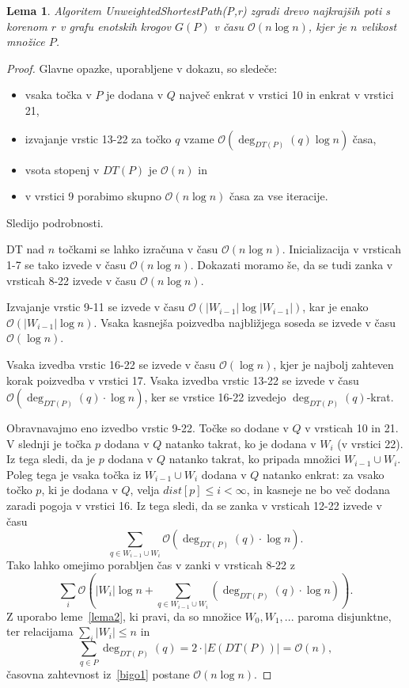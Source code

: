 \documentclass[a4paper, 12pt]{book}
\newcommand{\OO}{\ensuremath{\mathcal{O}}} %
\newtheorem{lema}[izrek]{Lema}
\begin{document}
\begin{lema}
\label{lema3}
Algoritem \textit{Unweigh\-ted\-Shor\-test\-Path(P,r)} zgradi drevo najkrajših poti s korenom $r$ v grafu enotskih krogov $G(P)$ v času $\OO(n\log n)$, kjer je $n$ velikost množice $P$.
\end{lema}

\begin{proof}
Glavne opazke, uporabljene v dokazu, so sledeče:
\begin{itemize}
\item vsaka točka v $P$ je dodana v $Q$ največ enkrat v vrstici 10 in enkrat v vrstici 21,
\item izvajanje vrstic 13-22 za točko $q$ vzame $\OO(\deg_{DT(P)}(q)\log n)$ časa,
\item vsota stopenj v $DT(P)$ je $\OO(n)$ in
\item v vrstici 9 porabimo skupno $\OO(n\log n)$ časa za vse iteracije.
\end{itemize}
Sledijo podrobnosti.

DT nad $n$ točkami se lahko izračuna v času $\OO(n\log n)$. Inicializacija v vrsticah 1-7 se tako izvede v času $\OO(n\log n)$. Dokazati moramo še, da se tudi zanka v vrsticah 8-22 izvede v času $\OO(n\log n)$.

Izvajanje vrstic 9-11 se izvede v času $\OO(|W_{i-1}|\log |W_{i-1}|)$, kar je enako $\OO(|W_{i-1}|\log n)$. Vsaka kasnejša poizvedba najbližjega soseda se izvede v času $\OO(\log n)$.

Vsaka izvedba vrstic 16-22 se izvede v času $\OO(\log n)$, kjer je najbolj zahteven korak poizvedba v vrstici 17. Vsaka izvedba vrstic 13-22 se izvede v času $\OO(\deg_{DT(P)}(q)\cdot\log n)$, ker se vrstice 16-22 izvedejo $\deg_{DT(P)}(q)$-krat.

Obravnavajmo eno izvedbo vrstic 9-22. Točke so dodane v $Q$ v vrsticah 10 in 21. V slednji je točka $p$ dodana v $Q$ natanko takrat, ko je dodana v $W_i$ (v vrstici 22). Iz tega sledi, da je $p$ dodana v $Q$ natanko takrat, ko pripada množici $W_{i-1}\cup W_i$. Poleg tega je vsaka točka iz $W_{i-1}\cup W_i$ dodana v $Q$ natanko enkrat: za vsako točko $p$, ki je dodana v $Q$, velja $dist[p]\leq i < \infty$, in kasneje ne bo več dodana zaradi pogoja v vrstici 16. Iz tega sledi, da se zanka v vrsticah 12-22 izvede v času
\begin{equation*}
\sum_{q\in W_{i-1}\cup W_i} \OO(\deg_{DT(P)}(q) \cdot \log n).
\end{equation*}
Tako lahko omejimo porabljen čas v zanki v vrsticah 8-22 z
\begin{equation}
\label{bigo1}
\sum_i \OO \left( |W_i|\log n + \sum_{q\in W_{i-1}\cup W_i} (\deg_{DT(P)}(q) \cdot \log n) \right) .
\end{equation}
Z uporabo leme~\ref{lema2}, ki pravi, da so množice $W_0,W_1,...$ paroma disjunktne, ter relacijama $\sum_i |W_i| \leq n$ in 
\begin{equation*}
\sum_{q \in P} \deg_{DT(P)}(q) = 2 \cdot |E(DT(P))| = \OO(n),
\end{equation*}
časovna zahtevnost iz~\eqref{bigo1} postane $\OO(n\log n)$.
\end{proof}
\end{document}
